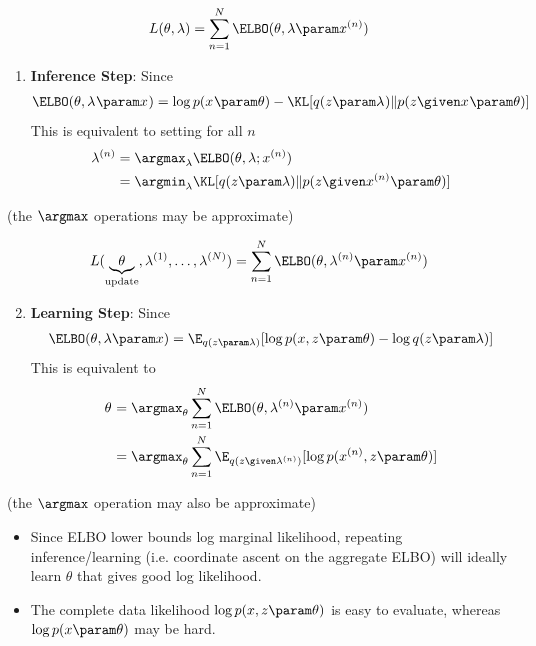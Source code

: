 \begin{frame}
\vspace{-6mm}
\[ L(\theta, \lambda) =  \sum_{n=1}^{N} \ELBO(\theta, \lambda \param x^{(n)}) \]
\begin{enumerate}
    \item \textbf{Inference Step}: Since
    \begin{align*}
        \ELBO(\theta, \lambda^{} \param x^{}) = \log p(x^{} \param \theta) -
     \KL[q(z \param \lambda^{}) \Vert p(z \given x^{} \param \theta)]
    \end{align*} 
    This is equivalent to setting for all $n$
    \begin{align*}
        \lambda^{(n)} &= \argmax_{\lambda} \ELBO(\theta, \lambda ; x^{(n)}) \\
        &= \argmin_{\lambda} \KL[q(z \param \lambda) \Vert p(z \given x^{(n)} \param \theta)]
    \end{align*} 
\end{enumerate}
(the $\argmax$ operations may be approximate)
\end{frame}

\begin{frame}
\vspace{-6mm}
\[ L(\underbrace{\theta}_{\text{update}}, \lambda^{(1)}, \dots, \lambda^{(N)}) =  \sum_{n=1}^{N} \ELBO(\theta, \lambda^{(n)}\param x^{(n)}) \]
\begin{enumerate}
 \setcounter{enumi}{1}
    \item \textbf{Learning Step}: Since
    \begin{align*}
        \ELBO(\theta, \lambda \param x) = \E_{q(z \param \lambda)}[\log p(x, z \param \theta) -\log q(z \param \lambda) ]
    \end{align*} 
    This is equivalent to
        \begin{align*}
            \theta^{} &= \argmax_\theta \sum_{n=1}^{N} \ELBO(\theta, \lambda^{(n)}\param x^{(n)}) \\
            &= \argmax_\theta \sum_{n=1}^N \E_{q(z \given \lambda^{(n)})}[\log p(x^{(n)}, z \param \theta)] 
        \end{align*} 
\end{enumerate}
(the $\argmax$ operation may also be approximate)
\end{frame}


\begin{frame}
\begin{itemize}
    \item Since ELBO lower bounds log marginal likelihood, repeating inference/learning (i.e. coordinate ascent on the aggregate ELBO) will ideally learn $\theta$ that gives good log likelihood.
    \item The complete data likelihood $\log p(x, z\param \theta)$ is easy to evaluate, whereas $\log p(x \param \theta)$ may be hard.
\end{itemize}
\end{frame}



